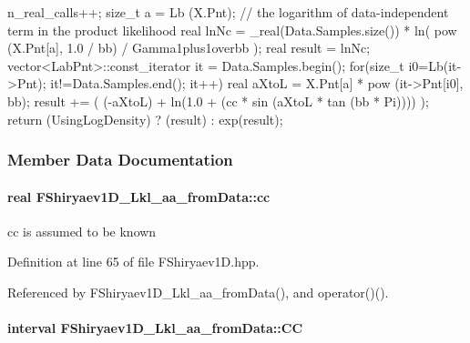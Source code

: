 \begin{DoxyCode}
{
  n_real_calls++;
  size_t a = Lb (X.Pnt);
  // the logarithm of data-independent term in the product likelihood
  real lnNc = _real(Data.Samples.size()) * 
              ln( pow (X.Pnt[a], 1.0 / bb) / Gamma1plus1overbb );
  real result = lnNc;
  vector<LabPnt>::const_iterator it = Data.Samples.begin();
  for(size_t i0=Lb(it->Pnt); it!=Data.Samples.end(); it++)
  {
    real aXtoL = X.Pnt[a] * pow (it->Pnt[i0], bb);
    result += ( (-aXtoL) + ln(1.0 + (cc * sin (aXtoL * tan (bb * Pi)))) );
  }
  return (UsingLogDensity) ? (result) : exp(result);
}
\end{DoxyCode}


\subsubsection{\-Member \-Data \-Documentation}
\hypertarget{classFShiryaev1D__Lkl__aa__fromData_a1790f5e4dfc6d207371994c04e154c21}{
\paragraph[{cc}]{\setlength{\rightskip}{0pt plus 5cm}real {\bf \-F\-Shiryaev1\-D\-\_\-\-Lkl\-\_\-aa\-\_\-from\-Data\-::cc}}}\label{classFShiryaev1D__Lkl__aa__fromData_a1790f5e4dfc6d207371994c04e154c21}


cc is assumed to be known 



\-Definition at line 65 of file \-F\-Shiryaev1\-D.\-hpp.



\-Referenced by \-F\-Shiryaev1\-D\-\_\-\-Lkl\-\_\-aa\-\_\-from\-Data(), and operator()().

\hypertarget{classFShiryaev1D__Lkl__aa__fromData_a306213ac1c465cf9d2bd6d1e502fcce2}{
\paragraph[{\-C\-C}]{\setlength{\rightskip}{0pt plus 5cm}interval {\bf \-F\-Shiryaev1\-D\-\_\-\-Lkl\-\_\-aa\-\_\-from\-Data\-::\-C\-C}}}\label{classFShiryaev1D__Lkl__aa__fromData_a306213ac1c465cf9d2bd6d1e502fcce2}


